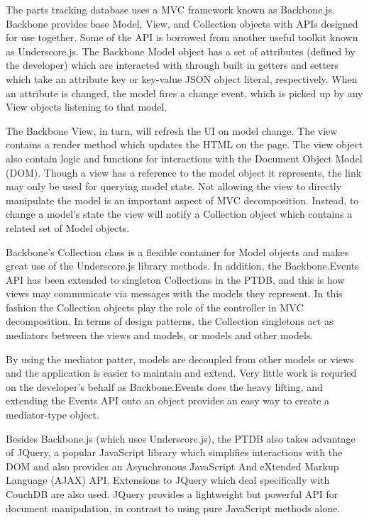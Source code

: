 \documentclass[journal]{IEEEtran}
\begin{document}
The parts tracking database uses a MVC framework known as Backbone.js. Backbone provides
base Model, View, and Collection objects with APIs designed for use together. Some of the
API is borrowed from another useful toolkit known as Underscore.js. The Backbone Model 
object has a set of attributes (defined by the developer) which are interacted with through
built in getters and setters which take an attribute key or key-value JSON object literal,
respectively. When an attribute is changed, the model fires a change event, which is picked
up by any View objects listening to that model.

The Backbone View, in turn, will refresh the UI on model change. The view contains a render
method which updates the HTML on the page. The view object also contain logic and functions
for interactions with the Document Object Model (DOM). Though a view has a reference to the model object it represents,
the link may only be used for querying model state. Not allowing the view to directly manipulate
the model is an important aspect of MVC decomposition. Instead, to change a model's state the
view will notify a Collection object which contains a related set of Model objects.

Backbone's Collection class is a flexible container for Model objects and makes great use
of the Underscore.js library methods. In addition, the Backbone.Events API has been extended
to singleton Collections in the PTDB, and this is how views may communicate via messages
with the models they represent. In this fashion the Collection objects play the role of
the controller in MVC decomposition. In terms of design patterns, the Collection singletons 
act as mediators between the views and models, or models and other models.

By using the mediator patter, models are decoupled from other models or views and the
application is easier to maintain and extend. Very little work is requried on the 
developer's behalf as Backbone.Events does the heavy lifting, and extending the Events
API onto an object provides an easy way to create a mediator-type object. 

Besides Backbone.js (which uses Underscore.js), the PTDB also takes advantage of JQuery,
a popular JavaScript library which simplifies interactions with the DOM and also provides
an Asynchronous JavaScript And eXtended Markup Language (AJAX) API. Extensions to JQuery which deal specifically with CouchDB are also used.
JQuery provides a lightweight but powerful API for document manipulation, in contrast to
using pure JavaScript methods alone.
\end{document}
